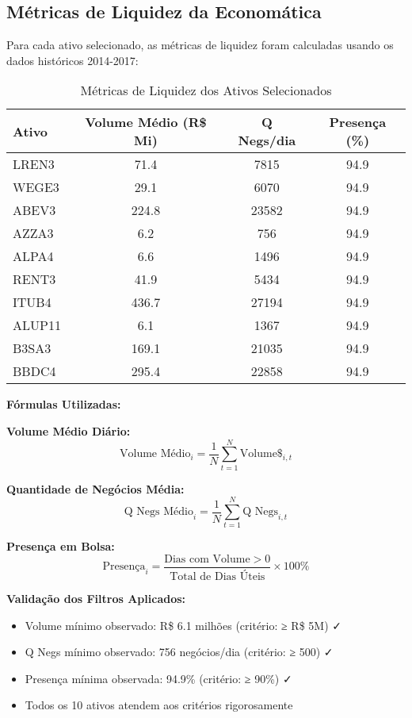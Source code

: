 \subsection{Métricas de Liquidez da Economática}

Para cada ativo selecionado, as métricas de liquidez foram calculadas usando os dados históricos 2014-2017:

\begin{table}[H]
\centering
\caption{Métricas de Liquidez dos Ativos Selecionados}
\begin{tabular}{|l|c|c|c|}
\hline
\textbf{Ativo} & \textbf{Volume Médio (R\$ Mi)} & \textbf{Q Negs/dia} & \textbf{Presença (\%)} \\
\hline
LREN3 & 71.4 & 7815 & 94.9 \\
WEGE3 & 29.1 & 6070 & 94.9 \\
ABEV3 & 224.8 & 23582 & 94.9 \\
AZZA3 & 6.2 & 756 & 94.9 \\
ALPA4 & 6.6 & 1496 & 94.9 \\
RENT3 & 41.9 & 5434 & 94.9 \\
ITUB4 & 436.7 & 27194 & 94.9 \\
ALUP11 & 6.1 & 1367 & 94.9 \\
B3SA3 & 169.1 & 21035 & 94.9 \\
BBDC4 & 295.4 & 22858 & 94.9 \\
\hline
\end{tabular}
\end{table}

\textbf{Fórmulas Utilizadas:}

\textbf{Volume Médio Diário:}
\begin{equation}
\text{Volume Médio}_i = \frac{1}{N} \sum_{t=1}^{N} \text{Volume}\$_{i,t}
\end{equation}

\textbf{Quantidade de Negócios Média:}
\begin{equation}
\text{Q Negs Médio}_i = \frac{1}{N} \sum_{t=1}^{N} \text{Q Negs}_{i,t}
\end{equation}

\textbf{Presença em Bolsa:}
\begin{equation}
\text{Presença}_i = \frac{\text{Dias com Volume} > 0}{\text{Total de Dias Úteis}} \times 100\%
\end{equation}

\textbf{Validação dos Filtros Aplicados:}
\begin{itemize}
    \item Volume mínimo observado: R\$ 6.1 milhões (critério: ≥ R\$ 5M) ✓
    \item Q Negs mínimo observado: 756 negócios/dia (critério: ≥ 500) ✓
    \item Presença mínima observada: 94.9\% (critério: ≥ 90\%) ✓
    \item Todos os 10 ativos atendem aos critérios rigorosamente
\end{itemize}

